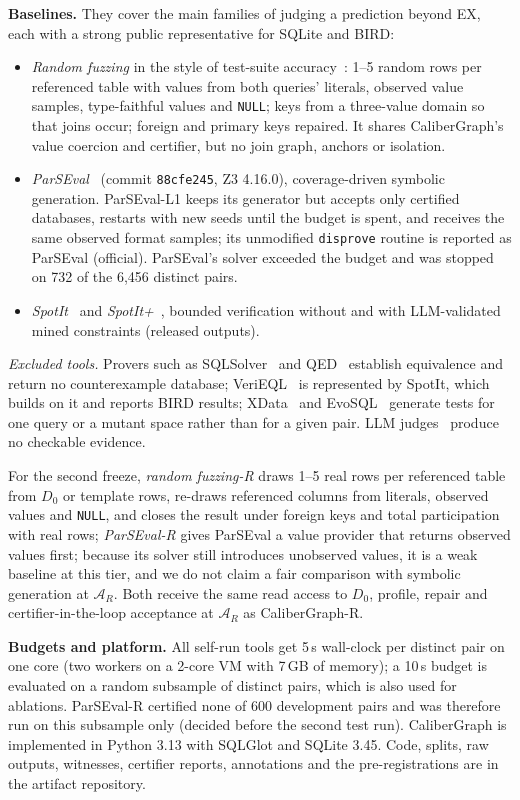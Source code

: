 \textbf{Baselines.} They cover the main families of judging a prediction beyond EX, each with a strong public representative for SQLite and BIRD:
\begin{itemize}
\item \emph{Random fuzzing} in the style of test-suite accuracy~\cite{zhong2020testsuite}: 1--5 random rows per referenced table with values from both queries' literals, observed value samples, type-faithful values and \texttt{NULL}; keys from a three-value domain so that joins occur; foreign and primary keys repaired. It shares CaliberGraph's value coercion and certifier, but no join graph, anchors or isolation.
\item \emph{ParSEval}~\cite{chen2025parseval} (commit \texttt{88cfe245}, Z3 4.16.0), coverage-driven symbolic generation. ParSEval-L1 keeps its generator but accepts only certified databases, restarts with new seeds until the budget is spent, and receives the same observed format samples; its unmodified \texttt{disprove} routine is reported as ParSEval (official). ParSEval's solver exceeded the budget and was stopped on 732 of the 6,456 distinct pairs.
\item \emph{SpotIt}~\cite{klopfenstein2026spotit} and \emph{SpotIt+}~\cite{tremante2026spotitplus}, bounded verification without and with LLM-validated mined constraints (released outputs).
\end{itemize}
\emph{Excluded tools.} Provers such as SQLSolver~\cite{ding2023sqlsolver} and QED~\cite{wang2024qed} establish equivalence and return no counterexample database; VeriEQL~\cite{he2024verieql} is represented by SpotIt, which builds on it and reports BIRD results; XData~\cite{chandra2015xdata} and EvoSQL~\cite{castelein2018evosql} generate tests for one query or a mutant space rather than for a given pair. LLM judges~\cite{kim2025flex} produce no checkable evidence.

For the second freeze, \emph{random fuzzing-R} draws 1--5 real rows per referenced table from $D_0$ or template rows, re-draws referenced columns from literals, observed values and \texttt{NULL}, and closes the result under foreign keys and total participation with real rows; \emph{ParSEval-R} gives ParSEval a value provider that returns observed values first; because its solver still introduces unobserved values, it is a weak baseline at this tier, and we do not claim a fair comparison with symbolic generation at $\mathcal A_R$. Both receive the same read access to $D_0$, profile, repair and certifier-in-the-loop acceptance at $\mathcal A_R$ as CaliberGraph-R.

\textbf{Budgets and platform.} All self-run tools get 5\,s wall-clock per distinct pair on one core (two workers on a 2-core VM with 7\,GB of memory); a 10\,s budget is evaluated on a random subsample of  distinct pairs, which is also used for ablations. ParSEval-R certified none of 600 development pairs and was therefore run on this subsample only (decided before the second test run). CaliberGraph is implemented in Python 3.13 with SQLGlot and SQLite 3.45. Code, splits, raw outputs, witnesses, certifier reports, annotations and the pre-registrations are in the artifact repository.
